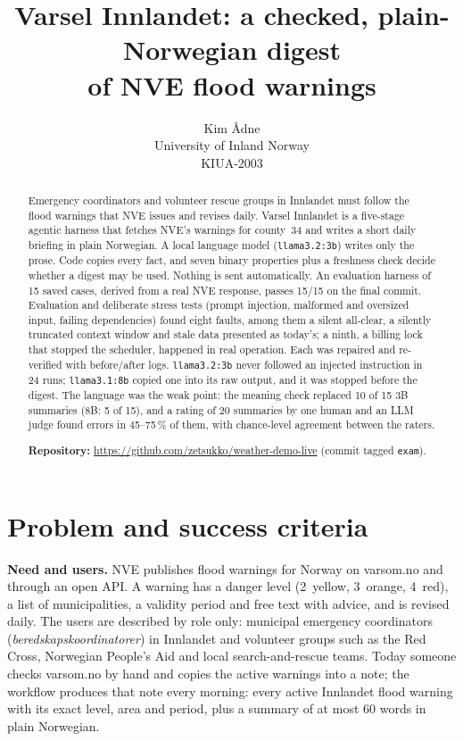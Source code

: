 \documentclass{article}
\title{Varsel Innlandet: a checked, plain-Norwegian digest\\of NVE flood warnings}
\author{%
  Kim \qquad Ådne \\
  University of Inland Norway \\
  KIUA-2003
}
\newcommand{\code}[1]{\texttt{#1}}
\begin{document}
\maketitle

\begin{abstract}
Emergency coordinators and volunteer rescue groups in Innlandet must follow the flood warnings that NVE issues and revises daily. Varsel Innlandet is a five-stage agentic harness that fetches NVE's warnings for county~34 and writes a short daily briefing in plain Norwegian. A local language model (\code{llama3.2:3b}) writes only the prose. Code copies every fact, and seven binary properties plus a freshness check decide whether a digest may be used. Nothing is sent automatically. An evaluation harness of 15 saved cases, derived from a real NVE response, passes 15/15 on the final commit. Evaluation and deliberate stress tests (prompt injection, malformed and oversized input, failing dependencies) found eight faults, among them a silent all-clear, a silently truncated context window and stale data presented as today's; a ninth, a billing lock that stopped the scheduler, happened in real operation. Each was repaired and re-verified with before/after logs. \code{llama3.2:3b} never followed an injected instruction in 24 runs; \code{llama3.1:8b} copied one into its raw output, and it was stopped before the digest. The language was the weak point: the meaning check replaced 10 of 15 3B summaries (8B: 5 of 15), and a rating of 20 summaries by one human and an LLM judge found errors in 45--75\,\% of them, with chance-level agreement between the raters.

\noindent\textbf{Repository:} \url{https://github.com/zetsukko/weather-demo-live} (commit tagged \code{exam}).
\end{abstract}

\section{Problem and success criteria}
\label{sec:problem}

\textbf{Need and users.} NVE publishes flood warnings for Norway on varsom.no and through an open API. A warning has a danger level (2~yellow, 3~orange, 4~red), a list of municipalities, a validity period and free text with advice, and is revised daily. The users are described by role only: municipal emergency coordinators (\emph{beredskapskoordinatorer}) in Innlandet and volunteer groups such as the Red Cross, Norwegian People's Aid and local search-and-rescue teams. Today someone checks varsom.no by hand and copies the active warnings into a note; the workflow produces that note every morning: every active Innlandet flood warning with its exact level, area and period, plus a summary of at most 60 words in plain Norwegian.
\end{document}
